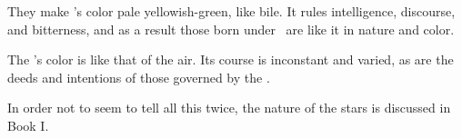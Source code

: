 They make \Mercury’s color pale yellowish-green, like bile. It rules intelligence, discourse, and bitterness, and as a result those born under \Mercury\, are like it in nature and color.

The \Moon’s color is like that of the air. Its course is inconstant and varied, as are the deeds and intentions of those governed by the \Moon.

In order not to seem to tell all this twice, the nature of the stars is discussed in Book I.

\newpage